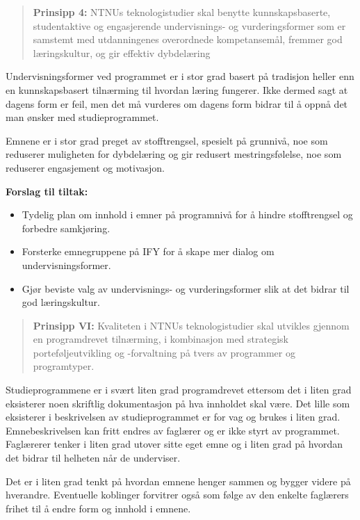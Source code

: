 \begin{quote}
	\textbf{Prinsipp 4:} NTNUs teknologistudier skal benytte kunnskapsbaserte, studentaktive og engasjerende undervisnings- og vurderingsformer som er samstemt med utdanningenes overordnede kompetansemål, fremmer god læringskultur, og gir effektiv dybdelæring
\end{quote}

Undervisningsformer ved programmet er i stor grad basert på tradisjon heller enn en kunnskapsbasert tilnærming til hvordan læring fungerer. Ikke dermed sagt at dagens form er feil, men det må vurderes om dagens form bidrar til å oppnå det man ønsker med studieprogrammet.

Emnene er i stor grad preget av stofftrengsel, spesielt på grunnivå, noe som reduserer muligheten for dybdelæring og gir redusert mestringsfølelse, noe som reduserer engasjement og motivasjon.

\textbf{Forslag til tiltak:}

\begin{itemize}
	\item Tydelig plan om innhold i emner på programnivå for å hindre stofftrengsel og forbedre samkjøring.
	\item Forsterke emnegruppene på IFY for å skape mer dialog om undervisningsformer.
	\item Gjør beviste valg av undervisnings- og vurderingsformer slik at det bidrar til god læringskultur.
\end{itemize}

\begin{quote}
	\textbf{Prinsipp VI:} Kvaliteten i NTNUs teknologistudier skal utvikles gjennom en programdrevet tilnærming, i kombinasjon med strategisk porteføljeutvikling og -forvaltning på tvers av programmer og programtyper.
\end{quote}

Studieprogrammene er i svært liten grad programdrevet ettersom det i liten grad eksisterer noen skriftlig dokumentasjon på hva innholdet skal være. Det lille som eksisterer i beskrivelsen av studieprogrammet er for vag og brukes i liten grad. Emnebeskrivelsen kan fritt endres av faglærer og er ikke styrt av programmet. Faglærerer tenker i liten grad utover sitte eget emne og i liten grad på hvordan det bidrar til helheten når de underviser.

Det er i liten grad tenkt på hvordan emnene henger sammen og bygger videre på hverandre. Eventuelle koblinger forvitrer også som følge av den enkelte faglærers frihet til å endre form og innhold i emnene.

